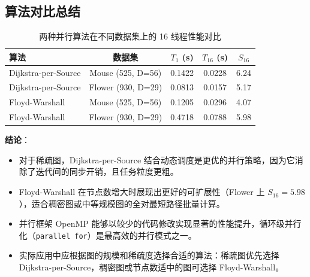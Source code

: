 \documentclass{SYSUReport}
\begin{document}
\subsection{算法对比总结}

\begin{table}[H]
  \centering
  \caption{两种并行算法在不同数据集上的 16 线程性能对比}
  \label{tab:comparison}
  \begin{tabular}{lcccc}
    \toprule
    \textbf{算法} & \textbf{数据集} & \textbf{$T_1$ (s)} & \textbf{$T_{16}$ (s)} & \textbf{$S_{16}$} \\
    \midrule
    Dijkstra-per-Source & Mouse (525, D=56)   & 0.1422 & 0.0228 & 6.24 \\
    Dijkstra-per-Source & Flower (930, D=29)  & 0.0813 & 0.0157 & 5.17 \\
    Floyd-Warshall      & Mouse (525, D=56)   & 0.1205 & 0.0296 & 4.07 \\
    Floyd-Warshall      & Flower (930, D=29)  & 0.4718 & 0.0788 & 5.98 \\
    \bottomrule
  \end{tabular}
\end{table}

\textbf{结论}：
\begin{itemize}
    \item 对于稀疏图，Dijkstra-per-Source 结合动态调度是更优的并行策略，因为它消除了迭代间的同步开销，且任务粒度更粗。
    \item Floyd-Warshall 在节点数增大时展现出更好的可扩展性（Flower 上 $S_{16}=5.98$），适合稠密图或中等规模图的全对最短路径批量计算。
    \item 并行框架 OpenMP 能够以较少的代码修改实现显著的性能提升，循环级并行化（\texttt{parallel for}）是最高效的并行模式之一。
    \item 实际应用中应根据图的规模和稀疏度选择合适的算法：稀疏图优先选择 Dijkstra-per-Source，稠密图或节点数适中的图可选择 Floyd-Warshall。
\end{itemize}
\end{document}
